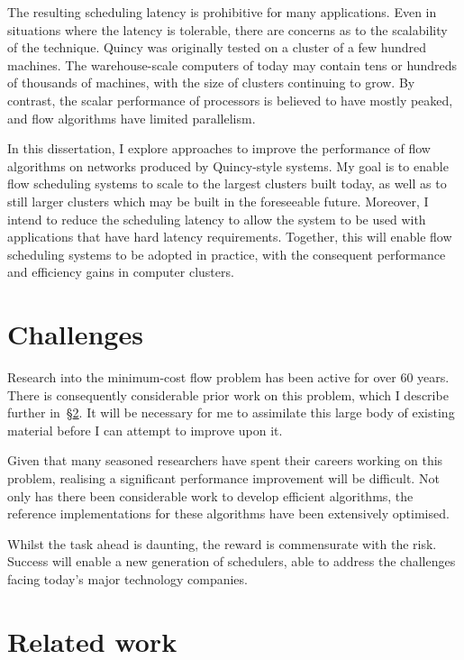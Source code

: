 The resulting scheduling latency is prohibitive for many applications. Even in situations where the latency is tolerable, there are concerns as to the scalability of the technique. Quincy was originally tested on a cluster of a few hundred machines. The warehouse-scale computers of today may contain tens or hundreds of thousands of machines, with the size of clusters continuing to grow. By contrast, the scalar performance of processors is believed to have mostly peaked, and flow algorithms have limited parallelism.

In this dissertation, I explore approaches to improve the performance of flow algorithms on networks produced by Quincy-style systems. My goal is to enable flow scheduling systems to scale to the largest clusters built today, as well as to still larger clusters which may be built in the foreseeable future. Moreover, I intend to reduce the scheduling latency to allow the system to be used with applications that have hard latency requirements. Together, this will enable flow scheduling systems to be adopted in practice, with the consequent performance and efficiency gains in computer clusters.

\section{Challenges} \label{sec:intro-challenges}
Research into the minimum-cost flow problem has been active for over 60 years. There is consequently considerable prior work on this problem, which I describe further in~\S\ref{sec:intro-related-work}. It will be necessary for me to assimilate this large body of existing material before I can attempt to improve upon it.

Given that many seasoned researchers have spent their careers working on this problem, realising a significant performance improvement will be difficult. Not only has there been considerable work to develop efficient algorithms, the reference implementations for these algorithms have been extensively optimised.

Whilst the task ahead is daunting, the reward is commensurate with the risk. Success will enable a new generation of schedulers, able to address the challenges facing today's major technology companies.

\section{Related work} \label{sec:intro-related-work}

